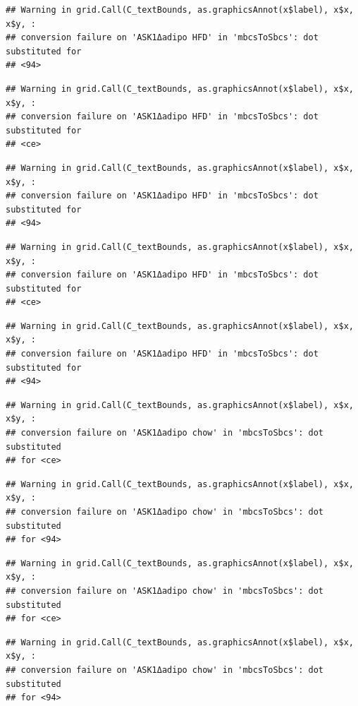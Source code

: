 \documentclass[]{book}
\begin{document}
\begin{verbatim}
## Warning in grid.Call(C_textBounds, as.graphicsAnnot(x$label), x$x, x$y, :
## conversion failure on 'ASK1Δadipo HFD' in 'mbcsToSbcs': dot substituted for
## <94>
\end{verbatim}

\begin{verbatim}
## Warning in grid.Call(C_textBounds, as.graphicsAnnot(x$label), x$x, x$y, :
## conversion failure on 'ASK1Δadipo HFD' in 'mbcsToSbcs': dot substituted for
## <ce>
\end{verbatim}

\begin{verbatim}
## Warning in grid.Call(C_textBounds, as.graphicsAnnot(x$label), x$x, x$y, :
## conversion failure on 'ASK1Δadipo HFD' in 'mbcsToSbcs': dot substituted for
## <94>
\end{verbatim}

\begin{verbatim}
## Warning in grid.Call(C_textBounds, as.graphicsAnnot(x$label), x$x, x$y, :
## conversion failure on 'ASK1Δadipo HFD' in 'mbcsToSbcs': dot substituted for
## <ce>
\end{verbatim}

\begin{verbatim}
## Warning in grid.Call(C_textBounds, as.graphicsAnnot(x$label), x$x, x$y, :
## conversion failure on 'ASK1Δadipo HFD' in 'mbcsToSbcs': dot substituted for
## <94>
\end{verbatim}

\begin{verbatim}
## Warning in grid.Call(C_textBounds, as.graphicsAnnot(x$label), x$x, x$y, :
## conversion failure on 'ASK1Δadipo chow' in 'mbcsToSbcs': dot substituted
## for <ce>
\end{verbatim}

\begin{verbatim}
## Warning in grid.Call(C_textBounds, as.graphicsAnnot(x$label), x$x, x$y, :
## conversion failure on 'ASK1Δadipo chow' in 'mbcsToSbcs': dot substituted
## for <94>
\end{verbatim}

\begin{verbatim}
## Warning in grid.Call(C_textBounds, as.graphicsAnnot(x$label), x$x, x$y, :
## conversion failure on 'ASK1Δadipo chow' in 'mbcsToSbcs': dot substituted
## for <ce>
\end{verbatim}

\begin{verbatim}
## Warning in grid.Call(C_textBounds, as.graphicsAnnot(x$label), x$x, x$y, :
## conversion failure on 'ASK1Δadipo chow' in 'mbcsToSbcs': dot substituted
## for <94>
\end{verbatim}
\end{document}
